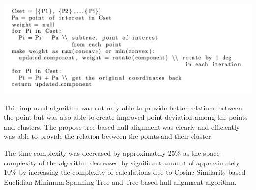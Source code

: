 \documentclass[11pt, a4paper]{article}
\newenvironment{Figure}
  {\par\medskip\noindent\minipage{\linewidth}}
  {\endminipage\par\medskip}
\begin{document}
\begin{multicols}{2}
        \begin{Figure}
            \includegraphics[width=\linewidth]{hull_alignment.png}
            \label{hull_alignment}
        \end{Figure}

        This improved algorithm was not only able to provide better relations between the point but was also able to create improved point deviation among the points and clusters. The propose tree based hull alignment was clearly and efficiently was able to provide the relation between the points and their cluster.

        The time complexity was decreased by approximately 25\% as the space-complexity of the algorithm decreased by significant amount of approximately 10\% by increasing the complexity of calculations due to Cosine Similarity based Euclidian Minimum Spanning Tree and Tree-based hull alignment algorithm.

    \newpage
\end{multicols}
\end{document}
